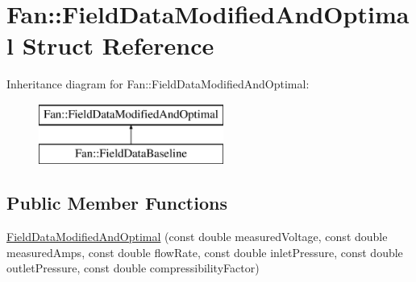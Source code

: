 \hypertarget{struct_fan_1_1_field_data_modified_and_optimal}{}\section{Fan\+:\+:Field\+Data\+Modified\+And\+Optimal Struct Reference}
\label{struct_fan_1_1_field_data_modified_and_optimal}
Inheritance diagram for Fan\+:\+:Field\+Data\+Modified\+And\+Optimal\+:\begin{figure}[H]
\begin{center}
\leavevmode
\includegraphics[height=2.000000cm]{d3/dba/struct_fan_1_1_field_data_modified_and_optimal}
\end{center}
\end{figure}
\subsection*{Public Member Functions}
\begin{DoxyCompactItemize}
\item 
\hyperlink{struct_fan_1_1_field_data_modified_and_optimal_a36b1ce30716ee49fab15b711225f1794}{Field\+Data\+Modified\+And\+Optimal} (const double measured\+Voltage, const double measured\+Amps, const double flow\+Rate, const double inlet\+Pressure, const double outlet\+Pressure, const double compressibility\+Factor)
\end{DoxyCompactItemize}
